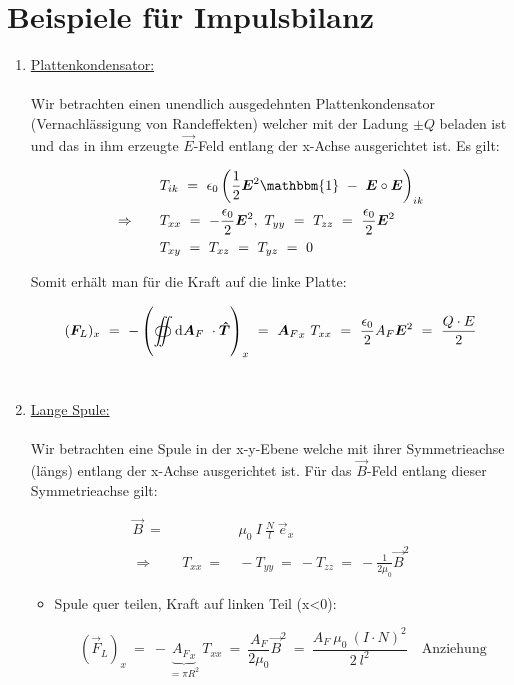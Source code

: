 \section{Beispiele für Impulsbilanz}

\begin{enumerate}[label=\roman*)]
\item \underline{Plattenkondensator:}\\
\ \\
Wir betrachten einen unendlich ausgedehnten Plattenkondensator (Vernachlässigung von Randeffekten) welcher mit der Ladung $\pm Q$ beladen ist und das in ihm erzeugte $\vec{E}$-Feld entlang der x-Achse ausgerichtet ist. Es gilt:

\begin{align*}
& T_{ik} \ = \ \epsilon_0 \left(\frac{1}{2}\vec{E}^2\mathbbm{1} \ - \ \vec{E}\circ\vec{E}\right)_{ik}\\
\Rightarrow \qquad & T_{xx} \ = \ -\frac{\epsilon_0}{2}\vec{E}^2, \ T_{yy} \ = \ T_{zz} \ = \ \frac{\epsilon_0}{2} \vec{E}^2\\
& T_{xy} \ = \ T_{xz} \ = \ T_{yz} \ = \ 0
\end{align*}

Somit erhält man für die Kraft auf die linke Platte:

\begin{equation*}
(\vec{F}_L)_x \ = \ - \left( \Oiint{}{}{\vec{A}_F} \cdot \tens{T}\right)_x \ = \ {\vec{A}_F}_x \ T_{xx} \ = \ \frac{\epsilon_0}{2} A_F \vec{E}^2 \ = \ \frac{Q\cdot E}{2}  
\end{equation*}
\ \\
\item \underline{Lange Spule:}\\
\ \\
Wir betrachten eine Spule in der x-y-Ebene welche mit ihrer Symmetrieachse (längs) entlang der x-Achse ausgerichtet ist.
Für das $\vec{B}$-Feld entlang dieser Symmetrieachse gilt:

\begin{align*}
\vec{B} \ =& \ \mu_0 \ I \ \frac{N}{l} \ \vec{e}_x\\
\Rightarrow \qquad T_{xx} \ =& \ - T_{yy} \ = \ -T_{zz} \ = \ - \frac{1}{2\mu_0}\vec{B}^2
\end{align*}

\begin{itemize}
\item Spule quer teilen, Kraft auf linken Teil (x<0):

\begin{equation*}
(\vec{F}_L)_x \ = \ - \underbrace{{A_F}_x}_{= \pi R^2} \ T_{xx} \ = \ \frac{A_F}{2\mu_0}\vec{B}^2 \ = \ \frac{A_F \ \mu_0 \ (I \cdot N)^2}{2\ l^2} \quad \text{Anziehung}
\end{equation*}


\end{itemize}
\end{enumerate}
